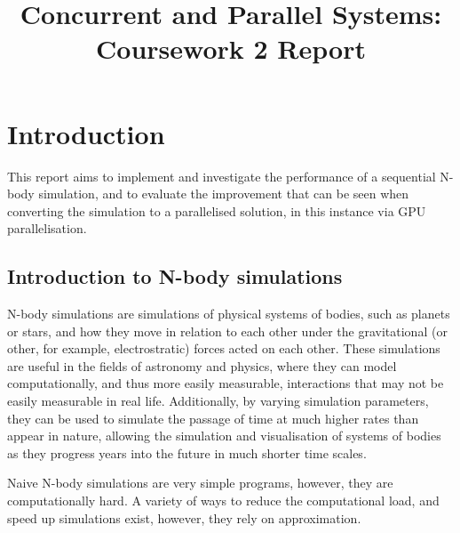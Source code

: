\documentclass[journal,transmag]{IEEEtran}
\begin{document}
    \title{Concurrent and Parallel Systems: Coursework 2 Report}
    \author{
    }

    \maketitle
    \IEEEdisplaynontitleabstractindextext

    \section{Introduction}
    This report aims to implement and investigate the performance of a sequential N-body simulation, and to evaluate
    the improvement that can be seen when converting the simulation to a parallelised solution, in this instance via
    GPU parallelisation.

        \subsection{Introduction to N-body simulations}
        N-body simulations are simulations of physical systems of bodies, such as planets or stars, and how they move
        in relation to each other under the gravitational (or other, for example, electrostratic) forces acted on each
        other. These simulations are useful in the fields of astronomy and physics, where they can model
        computationally, and thus more easily measurable, interactions that may not be easily measurable in real life.
        Additionally, by varying simulation parameters, they can be used to simulate the passage of time at much higher
        rates than appear in nature, allowing the simulation and visualisation of systems of bodies as they progress
        years into the future in much shorter time scales.

        Naive N-body simulations are very simple programs, however, they are computationally hard. A variety of ways to
        reduce the computational load, and speed up simulations exist, however, they rely on approximation.
\end{document}

